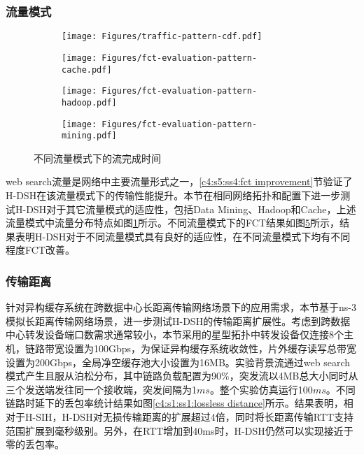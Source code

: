 \subsubsection{流量模式}

\begin{figure}[H]
  \begin{subfigure}[b]{0.47\linewidth}
      \centering
      \texttt{[image: Figures/traffic-pattern-cdf.pdf]}
      \label{c3:s6:ss1:fig:sub1:traffic pattern cdf}
  \end{subfigure}
  \begin{subfigure}[b]{0.47\linewidth}
      \centering
      \texttt{[image: Figures/fct-evaluation-pattern-cache.pdf]}
      \label{c3:s6:ss1:fig:sub1:fct cache}
  \end{subfigure}
  \begin{subfigure}[b]{0.47\linewidth}
    \centering
    \texttt{[image: Figures/fct-evaluation-pattern-hadoop.pdf]}
    \label{c3:s6:ss1:fig:sub1:fct hadoop}
  \end{subfigure}
  \begin{subfigure}[b]{0.47\linewidth}
    \centering
    \texttt{[image: Figures/fct-evaluation-pattern-mining.pdf]}
    \label{c3:s6:ss1:fig:sub1:fct mining}
  \end{subfigure}  
  \caption{不同流量模式下的流完成时间}
  \label{c3:s6:ss1:fig:fct different pattern}
\end{figure}

web search流量是网络中主要流量形式之一\cite{SIGCOMM10DCTCP}，\ref{c4:s5:ss4:fct improvement}节验证了H-DSH在该流量模式下的传输性能提升。本节在相同网络拓扑和配置下进一步测试H-DSH对于其它流量模式的适应性，包括Data Mining\cite{SIGCOMM09VL2}、Hadoop\cite{SIGCOMM15FB}和Cache\cite{SIGCOMM15FB}，上述流量模式中流量分布特点如图\ref{c3:s6:ss1:fig:sub1:traffic pattern cdf}所示。不同流量模式下的FCT结果如图\ref{c3:s6:ss1:fig:fct different pattern}所示，结果表明H-DSH对于不同流量模式具有良好的适应性，在不同流量模式下均有不同程度FCT改善。

\subsubsection{传输距离}

针对异构缓存系统在跨数据中心长距离传输网络场景下的应用需求，本节基于ns-3模拟长距离传输网络场景，进一步测试H-DSH的传输距离扩展性。考虑到跨数据中心转发设备端口数需求通常较小，本节采用的星型拓扑中转发设备仅连接8个主机，链路带宽设置为100Gbps，为保证异构缓存系统收敛性，片外缓存读写总带宽设置为200Gbps，全局净空缓存池大小设置为16MB。实验背景流通过web search模式产生且服从泊松分布，其中链路负载配置为90\%，突发流以4MB总大小同时从三个发送端发往同一个接收端，突发间隔为1$ms$。整个实验仿真运行100$ms$。不同链路时延下的丢包率统计结果如图\ref{c4:s1:ss1:lossless distance}所示。结果表明，相对于H-SIH，H-DSH对无损传输距离的扩展超过4倍，同时将长距离传输RTT支持范围扩展到毫秒级别。另外，在RTT增加到40ms时，H-DSH仍然可以实现接近于零的丢包率。

